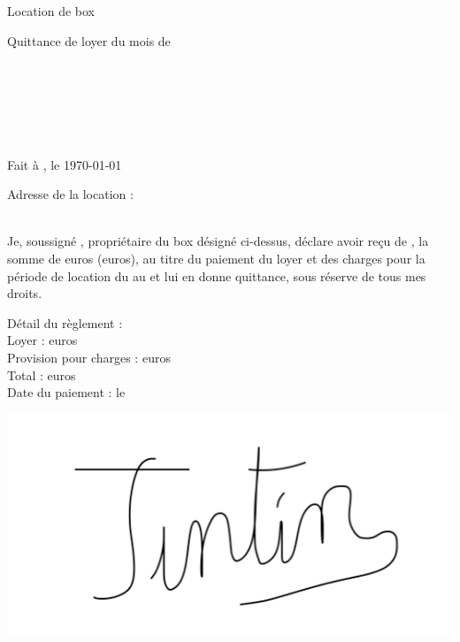 \documentclass[12pt,a4paper]{article}
\begin{document}
\thispagestyle{empty}

\begin{center}
Location de box\\
\begin{LARGE}
Quittance de loyer du mois de \nommois\space\annee
\end{LARGE}
\end{center}
\bigskip

\begin{flushleft}
\nomproprio\\
\adresseproprio\\
\villeproprio
\end{flushleft}

\medskip

\begin{flushright}
\nomlocataire\\
\adresselocataire\\
\villelocataire
\end{flushright}

\medskip

\begin{flushright}
Fait à \lieudocument, le \today
\end{flushright}

\medskip

\begin{flushleft}
Adresse de la location :\\
\adresselocation\\
\villelocation
\end{flushleft}

\medskip

\begin{flushleft}
Je, soussigné \nomproprio, propriétaire du box désigné ci-dessus, déclare avoir reçu
de \nomlocataire, la somme de \loyerchiffres\space euros (\loyerlettres\space euros), au titre
du paiement du loyer et des charges pour la période de location du \debutmois\space au
\finmois\space et lui en donne quittance, sous réserve de tous mes droits.
\end{flushleft}

\medskip

\begin{flushleft}
Détail du règlement :\\
Loyer : \loyerchiffres\space euros\\
Provision pour charges : \charges\space euros\\
Total : \totalpaiement\space euros\\
Date du paiement : le \datepaiement
\end{flushleft}

\medskip

\begin{center}
\includegraphics[width=0.3\linewidth]{Signature.PNG}
\end{center}
\end{document}
